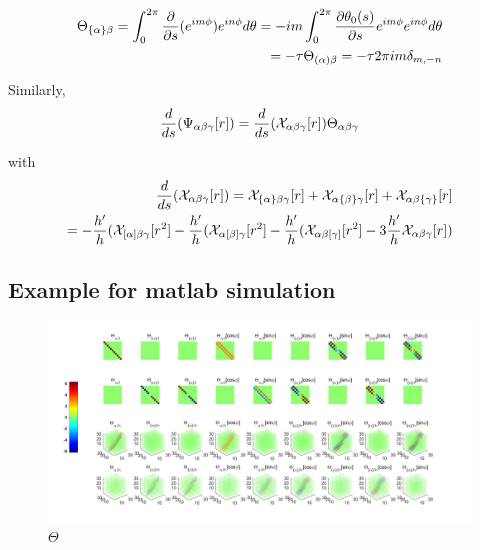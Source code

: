 \documentclass{Note}
\begin{document}
\begin{equation}
\begin{aligned}
\Theta_{\{\alpha\}\beta}=\int_0^{2\pi} {\partial \over \partial s}(e^{im\phi}) e^{in\phi} d\theta
=-im\int_0^{2\pi} {\partial\theta_0(s) \over \partial s}e^{im\phi}e^{in\phi} d\theta\\
=-\tau  \Theta_{(\alpha)\beta}=-\tau 2\pi   im \delta_{m,-n}
\end{aligned}
\end{equation}

Similarly,
\begin{equation}
\begin{aligned}
{d\over ds}(\Psi_{\alpha\beta\gamma}[r])={d\over ds}(\mathcal{X}_{\alpha\beta\gamma}[r])\Theta_{\alpha\beta\gamma}
\end{aligned}
\end{equation}

with
\begin{equation}
\begin{aligned}
{d\over ds}(\mathcal{X}_{\alpha\beta\gamma}[r])
=\mathcal{X}_{\{\alpha\}\beta\gamma}[r]+\mathcal{X}_{\alpha\{\beta\}\gamma}[r]+\mathcal{X}_{\alpha\beta\{\gamma\}}[r]\\
=-{h'\over h}(\mathcal{X}_{[\alpha]\beta\gamma}[r^2]-{h'\over h}(\mathcal{X}_{\alpha[\beta]\gamma}[r^2]-{h'\over h}(\mathcal{X}_{\alpha\beta[\gamma]}[r^2]-3{h'\over h}\mathcal{X}_{\alpha\beta\gamma}[r])
\end{aligned}
\end{equation}

\subsection{Example for matlab simulation}
\begin{figure}
  \centerline{\includegraphics[width=8in]{ThetaFun.jpg}}
  \caption{$\Theta$}
  \end{figure}
  
\end{document}
